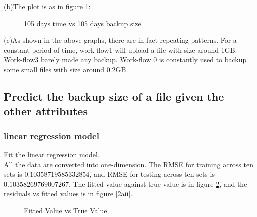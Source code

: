 \documentclass{article}
\begin{document}
(b)The plot is as in figure \ref{1b}:


\begin{figure}[!htbp]
\centering
{}
\caption{105 days time vs 105 days backup size} \label{1b}
\end{figure}

(c)As shown in the above graphs, there are in fact repeating patterns. For a constant period of time, work-flow1 will upload a file with size around 1GB. Work-flow3 barely made any backup. Work-flow 0 is constantly used to backup some small files with size around 0.2GB. 

\subsection{Predict the backup size of a file given the other attributes}

\subsubsection{linear regression model}
Fit the linear regression model. \\
All the data are converted into one-dimension. The RMSE for training across ten sets is $0.10358719585332854$, and RMSE for testing across ten sets is $0.10358269769007267$. The fitted value against true value is in figure \ref{2ai}, and the residuals vs fitted values is in figure \ref{2aii}. \\

\begin{figure}[!htbp]
\centering
{}
\caption{Fitted Value vs True Value} \label{2ai}
\end{figure}
\end{document}
